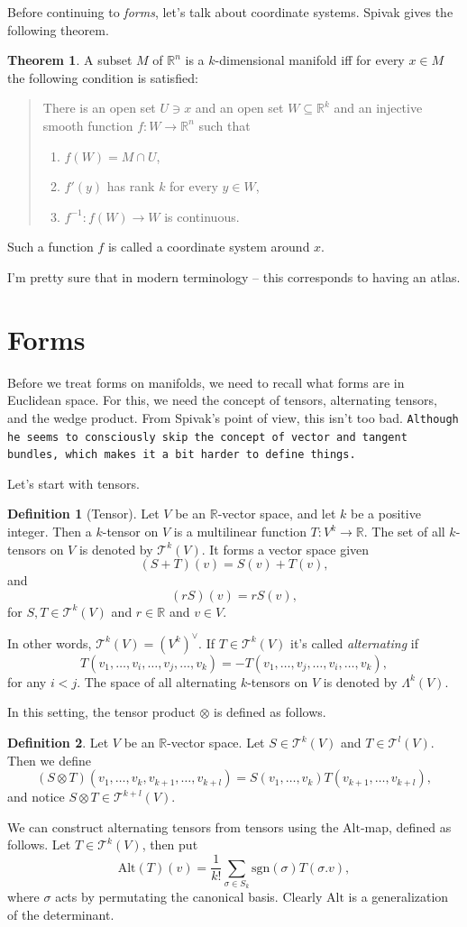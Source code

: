 \documentclass{article}
\theoremstyle{definition}
\newtheorem{defi}{Definition}
\newtheorem{theo}{Theorem}
\begin{document}
Before continuing to {\it forms}, let's talk about coordinate systems. Spivak gives the following theorem.
\begin{theo}
  A subset $M$ of $\mathbb{R}^n$ is a $k$-dimensional manifold iff for every $x\in M$ the following condition is satisfied:
  \begin{quotation}
    There is an open set $U\ni x$ and an open set $W\subseteq\mathbb{R}^k$ and an injective smooth function $f:W\to\mathbb{R}^n$ such that
    \begin{enumerate}
      \item $f(W)=M\cap U$,
      \item $f'(y)$ has rank $k$ for every $y\in W$,
      \item $f^{-1}:f(W)\to W$ is continuous.
    \end{enumerate}
  \end{quotation}
  Such a function $f$ is called a coordinate system around $x$.
\end{theo}
I'm pretty sure that in modern terminology -- this corresponds to having an atlas.
\section{Forms}
Before we treat forms on manifolds, we need to recall what forms are in Euclidean space. For this, we need the concept of tensors, alternating tensors, and the wedge product. From Spivak's point of view, this isn't too bad. {\tt Although he seems to consciously skip the concept of vector and tangent bundles, which makes it a bit harder to define things.}

Let's start with tensors.
\begin{defi}[Tensor]
  Let $V$ be an $\mathbb{R}$-vector space, and let $k$ be a positive integer. Then a $k$-tensor on $V$ is a multilinear function $T:V^k\to\mathbb{R}$. The set of all $k$-tensors on $V$ is denoted by $\mathcal{T}^k(V)$. It forms a vector space given
  \[(S+T)(v)=S(v)+T(v),\]
  and
  \[(rS)(v)=rS(v),\]
  for $S,T\in\mathcal{T}^k(V)$ and $r\in\mathbb{R}$ and $v\in V$.
\end{defi}
In other words, $\mathcal{T}^k(V)=(V^k)^\vee$. If $T\in\mathcal{T}^k(V)$ it's called {\it alternating} if
\[T(v_1,\dots,v_i,\dots,v_j,\dots,v_k)=-T(v_1,\dots,v_j,\dots,v_i,\dots,v_k),\]
for any $i<j$. The space of all alternating $k$-tensors on $V$ is denoted by $\Lambda^k(V)$.

In this setting, the tensor product $\otimes$ is defined as follows.
\begin{defi}
  Let $V$ be an $\mathbb{R}$-vector space. Let $S\in\mathcal{T}^k(V)$ and $T\in\mathcal{T}^l(V)$. Then we define
  \[(S\otimes T)(v_1,\dots,v_k,v_{k+1},\dots,v_{k+l})=S(v_1,\dots,v_k)T(v_{k+1},\dots,v_{k+l}),\]
  and notice $S\otimes T\in\mathcal{T}^{k+l}(V)$.
\end{defi}
We can construct alternating tensors from tensors using the $\mathrm{Alt}$-map, defined as follows. Let $T\in\mathcal{T}^k(V)$, then put
\[\mathrm{Alt}(T)(v)=\frac{1}{k!}\sum_{\sigma\in S_k}\mathrm{sgn}(\sigma)T(\sigma.v),\]
where $\sigma$ acts by permutating the canonical basis. Clearly $\mathrm{Alt}$ is a generalization of the determinant.
\end{document}
